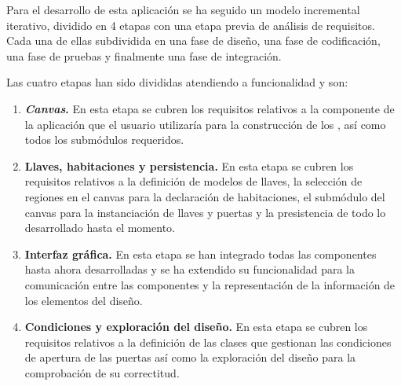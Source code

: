 Para el desarrollo de esta aplicación se ha seguido un modelo incremental iterativo, dividido en 4 etapas con una etapa previa de análisis de requisitos. Cada una de ellas subdividida en una fase de diseño, una fase de codificación, una fase de pruebas y finalmente una fase de integración.

Las cuatro etapas han sido divididas atendiendo a funcionalidad y son:
\begin{enumerate}
	\item \textbf{\textit{Canvas}.} En esta etapa se cubren los requisitos relativos a la componente de la aplicación que el usuario utilizaría para la construcción de los , así como todos los submódulos requeridos.
	\item \textbf{Llaves, habitaciones y persistencia.} En esta etapa se cubren los requisitos relativos a la definición de modelos de llaves, la selección de regiones en el canvas para la declaración de habitaciones, el submódulo del canvas para la instanciación de llaves y puertas y la presistencia de todo lo desarrollado hasta el momento.
	\item \textbf{Interfaz gráfica.} En esta etapa se han integrado todas las componentes hasta ahora desarrolladas y se ha extendido su funcionalidad para la comunicación entre las componentes y la representación de la información de los elementos del diseño.
	\item \textbf{Condiciones y exploración del diseño.} En esta etapa se cubren los requisitos relativos a la definición de las clases que gestionan las condiciones de apertura de las puertas así como la exploración del diseño para la comprobación de su correctitud.
\end{enumerate}